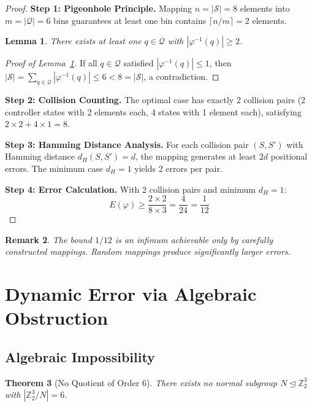 \documentclass[11pt]{article}
\newtheorem{theorem}{Theorem}[section]
\newtheorem{lemma}[theorem]{Lemma}
\newtheorem{remark}[theorem]{Remark}
\begin{document}
\begin{proof}
\textbf{Step 1: Pigeonhole Principle.} Mapping $n = |\mathcal{S}| = 8$ elements into $m = |\mathcal{Q}| = 6$ bins guarantees at least one bin contains $\lceil n/m \rceil = 2$ elements.

\begin{lemma}
\label{lem:pigeonhole}
There exists at least one $q \in \mathcal{Q}$ with $|\varphi^{-1}(q)| \geq 2$.
\end{lemma}

\begin{proof}[Proof of Lemma~\ref{lem:pigeonhole}]
If all $q \in \mathcal{Q}$ satisfied $|\varphi^{-1}(q)| \leq 1$, then $|\mathcal{S}| = \sum_{q \in \mathcal{Q}} |\varphi^{-1}(q)| \leq 6 < 8 = |\mathcal{S}|$, a contradiction. \qedhere
\end{proof}

\textbf{Step 2: Collision Counting.} The optimal case has exactly 2 collision pairs (2 controller states with 2 elements each, 4 states with 1 element each), satisfying $2 \times 2 + 4 \times 1 = 8$.

\textbf{Step 3: Hamming Distance Analysis.} For each collision pair $(S, S')$ with Hamming distance $d_H(S, S') = d$, the mapping generates at least $2d$ positional errors. The minimum case $d_H = 1$ yields 2 errors per pair.

\textbf{Step 4: Error Calculation.} With 2 collision pairs and minimum $d_H = 1$:
$$E(\varphi) \geq \frac{2 \times 2}{8 \times 3} = \frac{4}{24} = \frac{1}{12}$$
\end{proof}

\begin{remark}
The bound $1/12$ is an infimum achievable only by carefully constructed mappings. Random mappings produce significantly larger errors.
\end{remark}

\section{Dynamic Error via Algebraic Obstruction}
\label{sec:dynamic}

\subsection{Algebraic Impossibility}

\begin{theorem}[No Quotient of Order 6]
\label{thm:noquotient}
There exists no normal subgroup $N \trianglelefteq \mathbb{Z}_2^3$ with $|\mathbb{Z}_2^3 / N| = 6$.
\end{theorem}
\end{document}
